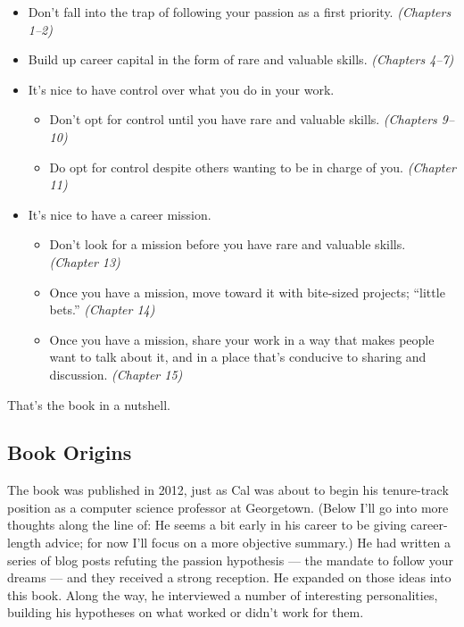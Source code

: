 \documentclass[
]{article}
\providecommand{\tightlist}{%
  \setlength{\itemsep}{0pt}\setlength{\parskip}{0pt}}
\begin{document}
\begin{itemize}
\tightlist
\item
  Don't fall into the trap of following your passion as a first
  priority. \emph{(Chapters 1--2)}
\item
  Build up career capital in the form of rare and valuable skills.
  \emph{(Chapters 4--7)}
\item
  It's nice to have control over what you do in your work.

  \begin{itemize}
  \tightlist
  \item
    Don't opt for control until you have rare and valuable skills.
    \emph{(Chapters 9--10)}
  \item
    Do opt for control despite others wanting to be in charge of you.
    \emph{(Chapter 11)}
  \end{itemize}
\item
  It's nice to have a career mission.

  \begin{itemize}
  \tightlist
  \item
    Don't look for a mission before you have rare and valuable skills.
    \emph{(Chapter 13)}
  \item
    Once you have a mission, move toward it with bite-sized projects;
    ``little bets.'' \emph{(Chapter 14)}
  \item
    Once you have a mission, share your work in a way that makes people
    want to talk about it, and in a place that's conducive to sharing
    and discussion. \emph{(Chapter 15)}
  \end{itemize}
\end{itemize}

That's the book in a nutshell.

\hypertarget{book-origins}{%
\subsection{Book Origins}\label{book-origins}}

The book was published in 2012, just as Cal was about to begin his
tenure-track position as a computer science professor at Georgetown.
(Below I'll go into more thoughts along the line of: He seems a bit
early in his career to be giving career-length advice; for now I'll
focus on a more objective summary.) He had written a series of blog
posts refuting the passion hypothesis --- the mandate to follow your
dreams --- and they received a strong reception. He expanded on those
ideas into this book. Along the way, he interviewed a number of
interesting personalities, building his hypotheses on what worked or
didn't work for them.
\end{document}
